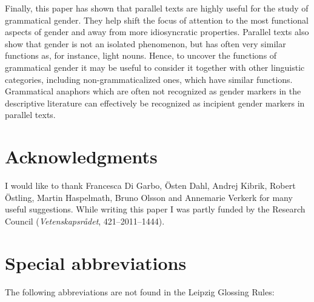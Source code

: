 \documentclass[output=collectionpaper]{langsci/langscibook}
\begin{document}
Finally, this paper has shown that parallel texts are highly useful for the study of grammatical gender. They help shift the focus of attention to the most functional aspects of gender and away from more idiosyncratic properties. Parallel texts also show that gender is not an isolated phenomenon, but has often very similar functions as, for instance, light nouns. Hence, to uncover the functions of grammatical gender it may be useful to consider it together with other linguistic categories, including non-grammaticalized ones, which have similar functions. Grammatical anaphors which are often not recognized as gender markers in the descriptive literature can effectively be recognized as incipient gender markers in parallel texts.

\section*{Acknowledgments}

I would like to thank Francesca Di Garbo, Östen Dahl, Andrej Kibrik, Robert Östling, Martin Haspelmath, Bruno Olsson and Annemarie Verkerk for many useful suggestions. While writing this paper I was partly funded by the  Research Council (\textit{Vetenskapsrådet}, 421--2011--1444).

\section*{Special abbreviations}
\noindent The following abbreviations are not found in the Leipzig Glossing Rules:
\medskip
\end{document}
